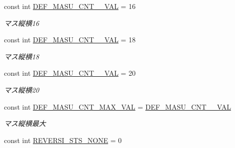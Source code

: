 \begin{DoxyCompactItemize}
\mbox{\label{class_reversi_wpf_1_1_reversi_const_aa68c96db0ed835bd1cf93f753bdab0e0}} 
const int \hyperlink{class_reversi_wpf_1_1_reversi_const_aa68c96db0ed835bd1cf93f753bdab0e0}{D\+E\+F\+\_\+\+M\+A\+S\+U\+\_\+\+C\+N\+T\+\_\+\_\+\+V\+AL} = 16
\begin{DoxyCompactList}\small\item\em マス縦横16 \end{DoxyCompactList}\item 
\mbox{\label{class_reversi_wpf_1_1_reversi_const_a5457ff9798cfea70af97961984ef3605}} 
const int \hyperlink{class_reversi_wpf_1_1_reversi_const_a5457ff9798cfea70af97961984ef3605}{D\+E\+F\+\_\+\+M\+A\+S\+U\+\_\+\+C\+N\+T\+\_\+\_\+\+V\+AL} = 18
\begin{DoxyCompactList}\small\item\em マス縦横18 \end{DoxyCompactList}\item 
\mbox{\label{class_reversi_wpf_1_1_reversi_const_aa8995a346bcfbc7d123987d836a2de13}} 
const int \hyperlink{class_reversi_wpf_1_1_reversi_const_aa8995a346bcfbc7d123987d836a2de13}{D\+E\+F\+\_\+\+M\+A\+S\+U\+\_\+\+C\+N\+T\+\_\+\_\+\+V\+AL} = 20
\begin{DoxyCompactList}\small\item\em マス縦横20 \end{DoxyCompactList}\item 
\mbox{\label{class_reversi_wpf_1_1_reversi_const_ab53dc319c17454a37b512e8c99dfde98}} 
const int \hyperlink{class_reversi_wpf_1_1_reversi_const_ab53dc319c17454a37b512e8c99dfde98}{D\+E\+F\+\_\+\+M\+A\+S\+U\+\_\+\+C\+N\+T\+\_\+\+M\+A\+X\+\_\+\+V\+AL} = \hyperlink{class_reversi_wpf_1_1_reversi_const_aa8995a346bcfbc7d123987d836a2de13}{D\+E\+F\+\_\+\+M\+A\+S\+U\+\_\+\+C\+N\+T\+\_\+\_\+\+V\+AL}
\begin{DoxyCompactList}\small\item\em マス縦横最大 \end{DoxyCompactList}\item 
\mbox{\label{class_reversi_wpf_1_1_reversi_const_aff9ffccfb098630f453da72b92291eb5}} 
const int \hyperlink{class_reversi_wpf_1_1_reversi_const_aff9ffccfb098630f453da72b92291eb5}{R\+E\+V\+E\+R\+S\+I\+\_\+\+S\+T\+S\+\_\+\+N\+O\+NE} = 0

\end{DoxyCompactItemize}
